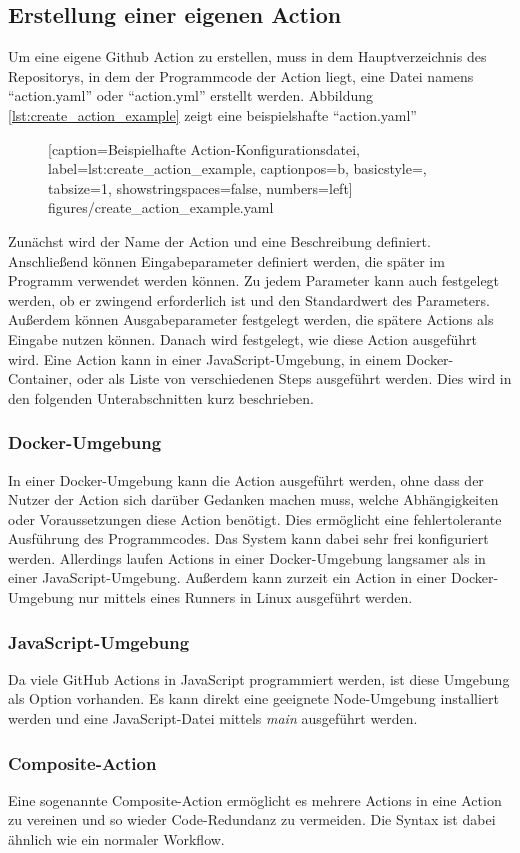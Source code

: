 \subsection{Erstellung einer eigenen Action}
Um eine eigene Github Action zu erstellen, muss in dem Hauptverzeichnis des Repositorys, in dem der Programmcode der Action liegt, eine Datei namens \enquote{action.yaml} oder \enquote{action.yml} erstellt werden. Abbildung \ref{lst:create_action_example} zeigt eine beispielshafte \enquote{action.yaml}
	\begin{figure}[h!]
			
			[caption={Beispielhafte Action-Konfigurationsdatei},
			label={lst:create_action_example},
			captionpos=b, basicstyle=\footnotesize, tabsize=1, showstringspaces=false,  numbers=left]
			{figures/create_action_example.yaml}
		\end{figure}
Zunächst wird der Name der Action und eine Beschreibung definiert. Anschließend können Eingabeparameter definiert werden, die später im Programm verwendet werden können. Zu jedem Parameter kann auch festgelegt werden, ob er zwingend erforderlich ist und den Standardwert des Parameters. Außerdem können Ausgabeparameter festgelegt werden, die spätere Actions als Eingabe nutzen können. Danach wird festgelegt, wie diese Action ausgeführt wird. Eine Action kann in einer JavaScript-Umgebung, in einem Docker-Container, oder als Liste von verschiedenen Steps ausgeführt werden. Dies wird in den folgenden Unterabschnitten kurz beschrieben.
\subsubsection{Docker-Umgebung}
In einer Docker-Umgebung kann die Action ausgeführt werden, ohne dass der Nutzer der Action sich darüber Gedanken machen muss, welche Abhängigkeiten oder Voraussetzungen diese Action benötigt. Dies ermöglicht eine fehlertolerante Ausführung des Programmcodes. Das System kann dabei sehr frei konfiguriert werden. Allerdings laufen Actions in einer Docker-Umgebung langsamer als in einer JavaScript-Umgebung. Außerdem kann zurzeit ein Action in einer Docker-Umgebung nur mittels eines Runners in Linux ausgeführt werden.

\subsubsection{JavaScript-Umgebung}
Da viele GitHub Actions in JavaScript programmiert werden, ist diese Umgebung als Option vorhanden. Es kann direkt eine geeignete Node-Umgebung installiert werden und eine JavaScript-Datei mittels \textit{main} ausgeführt werden. 

\subsubsection{Composite-Action}
Eine sogenannte Composite-Action ermöglicht es mehrere Actions in eine Action zu vereinen und so wieder Code-Redundanz zu vermeiden. Die Syntax ist dabei ähnlich wie ein normaler Workflow. 
